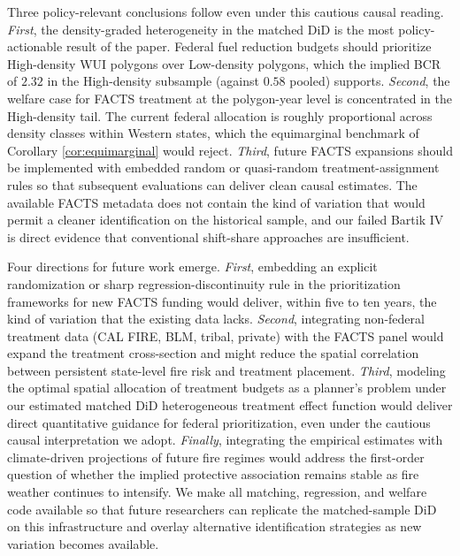 \documentclass[12pt, letterpaper]{article}
\begin{document}
Three policy-relevant conclusions follow even under this cautious causal reading. \textit{First}, the density-graded heterogeneity in the matched DiD is the most policy-actionable result of the paper. Federal fuel reduction budgets should prioritize High-density WUI polygons over Low-density polygons, which the implied BCR of $2.32$ in the High-density subsample (against $0.58$ pooled) supports. \textit{Second}, the welfare case for FACTS treatment at the polygon-year level is concentrated in the High-density tail. The current federal allocation is roughly proportional across density classes within Western states, which the equimarginal benchmark of Corollary \ref{cor:equimarginal} would reject. \textit{Third}, future FACTS expansions should be implemented with embedded random or quasi-random treatment-assignment rules so that subsequent evaluations can deliver clean causal estimates. The available FACTS metadata does not contain the kind of variation that would permit a cleaner identification on the historical sample, and our failed Bartik IV is direct evidence that conventional shift-share approaches are insufficient.

Four directions for future work emerge. \textit{First}, embedding an explicit randomization or sharp regression-discontinuity rule in the prioritization frameworks for new FACTS funding would deliver, within five to ten years, the kind of variation that the existing data lacks. \textit{Second}, integrating non-federal treatment data (CAL FIRE, BLM, tribal, private) with the FACTS panel would expand the treatment cross-section and might reduce the spatial correlation between persistent state-level fire risk and treatment placement. \textit{Third}, modeling the optimal spatial allocation of treatment budgets as a planner's problem under our estimated matched DiD heterogeneous treatment effect function would deliver direct quantitative guidance for federal prioritization, even under the cautious causal interpretation we adopt. \textit{Finally}, integrating the empirical estimates with climate-driven projections of future fire regimes would address the first-order question of whether the implied protective association remains stable as fire weather continues to intensify. We make all matching, regression, and welfare code available so that future researchers can replicate the matched-sample DiD on this infrastructure and overlay alternative identification strategies as new variation becomes available.
\end{document}
